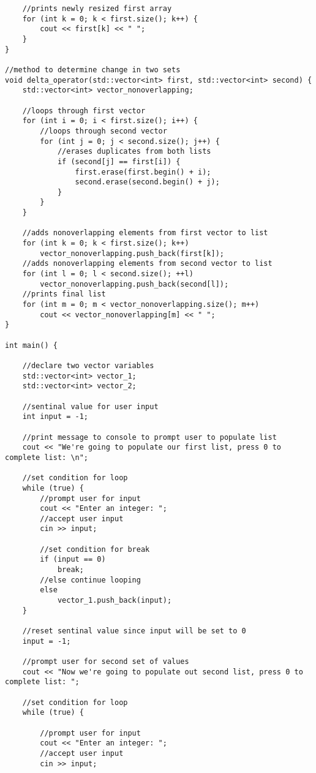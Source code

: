\documentclass[11pt]{article}
\begin{document}
\begin{lstlisting}
    //prints newly resized first array
    for (int k = 0; k < first.size(); k++) {
        cout << first[k] << " ";
    }
}

//method to determine change in two sets
void delta_operator(std::vector<int> first, std::vector<int> second) {
    std::vector<int> vector_nonoverlapping;

    //loops through first vector
    for (int i = 0; i < first.size(); i++) {
        //loops through second vector
        for (int j = 0; j < second.size(); j++) {
            //erases duplicates from both lists
            if (second[j] == first[i]) {
                first.erase(first.begin() + i);
                second.erase(second.begin() + j);
            }
        }
    }

    //adds nonoverlapping elements from first vector to list
    for (int k = 0; k < first.size(); k++)
        vector_nonoverlapping.push_back(first[k]);
    //adds nonoverlapping elements from second vector to list
    for (int l = 0; l < second.size(); ++l)
        vector_nonoverlapping.push_back(second[l]);
    //prints final list
    for (int m = 0; m < vector_nonoverlapping.size(); m++)
        cout << vector_nonoverlapping[m] << " ";
}

int main() {

    //declare two vector variables
    std::vector<int> vector_1;
    std::vector<int> vector_2;

    //sentinal value for user input
    int input = -1;

    //print message to console to prompt user to populate list
    cout << "We're going to populate our first list, press 0 to complete list: \n";

    //set condition for loop
    while (true) {
        //prompt user for input
        cout << "Enter an integer: ";
        //accept user input
        cin >> input;

        //set condition for break
        if (input == 0)
            break;
        //else continue looping
        else
            vector_1.push_back(input);
    }

    //reset sentinal value since input will be set to 0
    input = -1;

    //prompt user for second set of values
    cout << "Now we're going to populate out second list, press 0 to complete list: ";

    //set condition for loop
    while (true) {

        //prompt user for input
        cout << "Enter an integer: ";
        //accept user input
        cin >> input;


\end{lstlisting}
\end{document}

